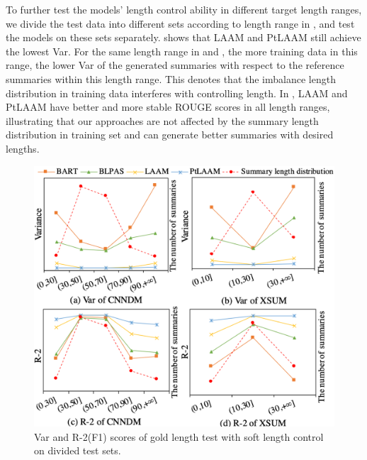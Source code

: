 To further test the models' length control ability in
different target length ranges, we divide the test data into different sets according to 
length range in , and test the models on these sets separately.
 shows that LAAM and PtLAAM still achieve the lowest Var.
For the same length range in  and , the more training data in this range, the lower Var of the generated summaries with respect to the reference summaries within this length range.
This denotes that the imbalance length distribution in training data
interferes with controlling length.
In ,
LAAM and PtLAAM have better and more stable ROUGE scores in all length ranges,
illustrating that our approaches are
not affected by the summary length distribution in training set 
and can generate better summaries with desired lengths.

\begin{figure}[!ht]
	\centering
	\scriptsize
	\includegraphics[width=1\linewidth]{div_var_r.pdf}
	\caption{Var and R-2(F1) scores of gold length test with soft length control on divided test sets.}
	\label{fig:div_var_r}
\end{figure}

